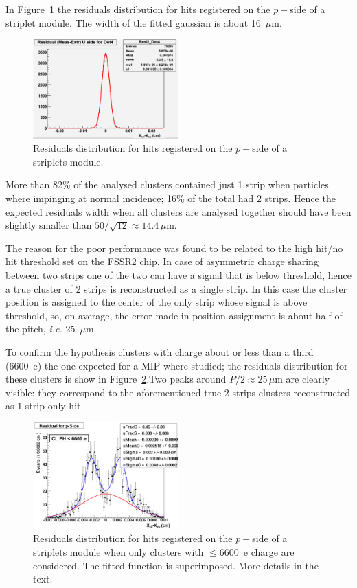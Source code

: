 In Figure~\ref{fig:res_pside} the residuals distribution for hits registered on the $p-$side of a striplet 
module. The width of the fitted gaussian is about 16~$\mu$m.

\begin{figure}[!htpb]
\centering
\includegraphics[width=0.5\textwidth]{res_pisde.pdf}
\caption{\label{fig:res_pside}Residuals distribution for hits registered on the $p-$side of a 
striplets module.}
\end{figure}

More than 82\% of the analysed clusters contained just 1 strip when particles where impinging 
at normal incidence; 16\% of the total had 2 strips. Hence the expected residuals width when all 
clusters are analysed together should have been slightly smaller than 
$50/\sqrt{12}\approx 14.4\, \mu$m. 

The reason for the poor performance was found to be related to the high hit/no hit threshold set 
on the FSSR2 chip. In case of asymmetric charge sharing between two strips one of the two 
can have a signal that is below threshold, hence a true cluster of 2 strips is reconstructed as a single 
strip. In this case the cluster position is assigned to the center of the only strip whose signal is 
above threshold, so, on average, the error made in position assignment is about half of the pitch, 
{\it i.e.} 25~$\mu$m.

To confirm the hypothesis clusters with charge about or less than
 a third (6600~e) the one expected for a MIP where 
studied; the residuals distribution for these clusters is show in 
Figure~\ref{fig:annotated_res_pside_1stPHbin}.Two peaks around $P/2\approx25\,\mu$m are clearly visible: they correspond to the aforementioned true 2 strips clusters reconstructed as 1 strip only 
hit.


\begin{figure}
\centering
\includegraphics[width=0.5\textwidth]{annotated_res_pside_1stPHbin.pdf}
\caption{\label{fig:annotated_res_pside_1stPHbin}Residuals distribution for hits registered on the $p-$side of a 
striplets module when only clusters with $\le$6600~e charge are considered. The fitted function is 
superimposed. More details in the text.}
\end{figure}

